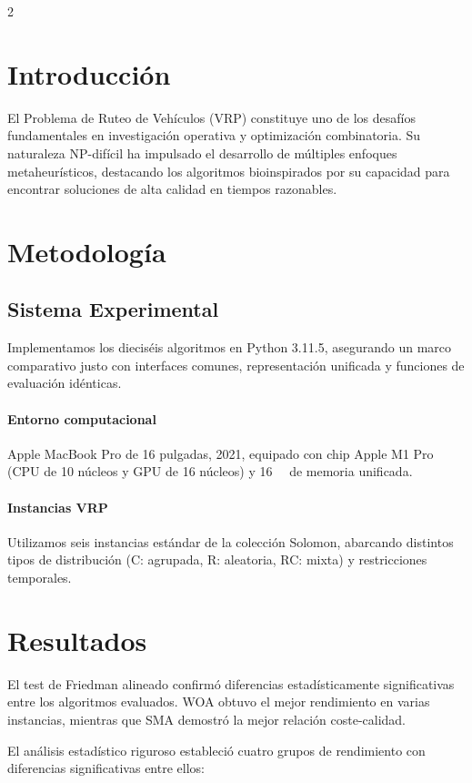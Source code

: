 \documentclass[10pt,a4paper]{extarticle}
\begin{document}
\vspace{1em}
\begin{multicols}{2}

\section{Introducción}
El Problema de Ruteo de Vehículos (VRP) constituye uno de los desafíos fundamentales en investigación operativa y optimización combinatoria. Su naturaleza NP-difícil ha impulsado el desarrollo de múltiples enfoques metaheurísticos, destacando los algoritmos bioinspirados por su capacidad para encontrar soluciones de alta calidad en tiempos razonables.

\section{Metodología}
\subsection{Sistema Experimental}
Implementamos los dieciséis algoritmos en Python 3.11.5, asegurando un marco comparativo justo con interfaces comunes, representación unificada y funciones de evaluación idénticas.

\paragraph{Entorno computacional} Apple MacBook Pro de 16 pulgadas, 2021, equipado con chip Apple M1 Pro (CPU de 10 núcleos y GPU de 16 núcleos) y \SI{16}{\giga\byte} de memoria unificada.

\paragraph{Instancias VRP} Utilizamos seis instancias estándar de la colección Solomon, abarcando distintos tipos de distribución (C: agrupada, R: aleatoria, RC: mixta) y restricciones temporales.

\section{Resultados}
El test de Friedman alineado confirmó diferencias estadísticamente significativas entre los algoritmos evaluados. WOA obtuvo el mejor rendimiento en varias instancias, mientras que SMA demostró la mejor relación coste-calidad.

El análisis estadístico riguroso estableció cuatro grupos de rendimiento con diferencias significativas entre ellos:


\end{multicols}
\end{document}

